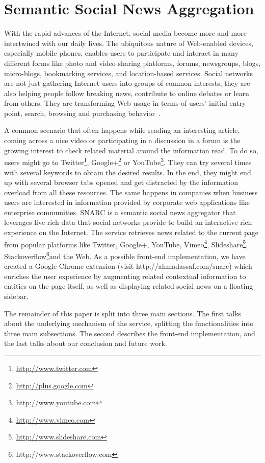 \chapter{Semantic Social News Aggregation}\label{chapter:snarc}
\graphicspath{{Part2/Chapter3/figures/}}

With the rapid advances of the Internet, social media become more and more intertwined with our daily lives. The ubiquitous nature of Web-enabled devices, especially mobile phones, enables users to participate and interact in many different forms like photo and video sharing platforms, forums, newsgroups, blogs, micro-blogs, bookmarking services, and location-based services. Social networks are not just gathering Internet users into groups of common interests, they are also helping people follow breaking news, contribute to online debates or learn from others. They are transforming Web usage in terms of users' initial entry point, search, browsing and purchasing behavior~\cite{Bakshy:WWW:12}.

A common scenario that often happens while reading an interesting article, coming across a nice video or participating in a discussion in a forum is the growing interest to check related material around the information read. To do so, users might go to Twitter\footnote{\url{http://www.twitter.com}}, Google+\footnote{\url{http://plus.google.com}} or YouTube\footnote{\url{http://www.youtube.com}}. They can try several times with several keywords to obtain the desired results. In the end, they might end up with several browser tabs opened and get distracted by the information overload from all these resources. The same happens in companies when business users are interested in information provided by corporate web applications like enterprise communities. SNARC is a semantic social news aggregator that leverages live rich data that social networks provide to build an interactive rich experience on the Internet. The service retrieves news related to the current page from popular platforms like Twitter, Google+, YouTube, Vimeo\footnote{\url{http://www.vimeo.com}}, Slideshare\footnote{\url{http://www.slideshare.com}}, Stackoverflow\footnote{http://www.stackoverflow.com}and the Web. As a possible front-end implementation, we have created a Google Chrome extension (visit http://ahmadassaf.com/snarc) which enriches the user experience by augmenting related contextual information to entities on the page itself, as well as displaying related social news on a floating sidebar.

The remainder of this paper is split into three main sections. The first talks about the underlying mechanism of the service, splitting the functionalities into three main subsections. The second describes the front-end implementation, and the last talks about our conclusion and future work.

